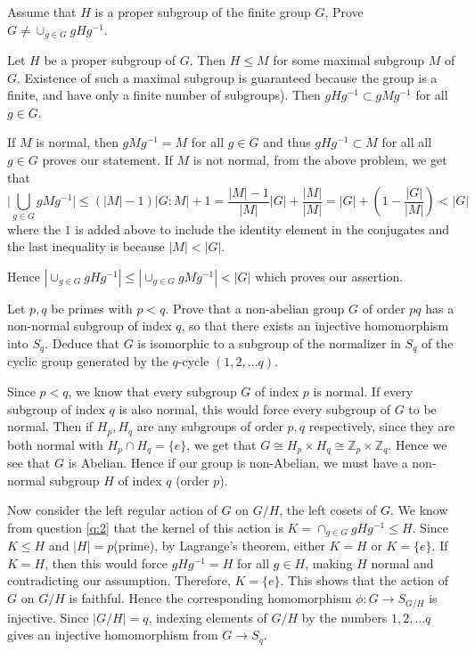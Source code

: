 \documentclass[12pt]{exam}
\theoremstyle{plain} %
\theoremstyle{definition} %
\theoremstyle{remark} %
\begin{document}
\begin{questions}
  \question
  Assume that $H$ is a proper subgroup of the finite group $G$, Prove
  $G \neq \cup_{g \in G}gHg^{-1}$.
  \begin{solution}
    Let $H$ be a proper subgroup of $G$. Then $H \leqslant M$ for
    some maximal subgroup $M$ of $G$. Existence of such a maximal
    subgroup is guaranteed because the group
  is a finite, and have only a finite number of subgroups).
  Then $gHg^{-1} \subset gMg^{-1}$ for all $g \in G$.

  If $M$ is normal, then $gMg^{-1} = M$ for all $g \in G$ and thus $gHg^{-1}
  \subset M$ for all all $g \in G$ proves our statement.
  If $M$ is not normal, from the above problem, we get that \[
    \big|\bigcup_{g \in G}gMg^{-1}\big| \le (|M| - 1)|G:M| + 1 =
    \frac{|M|-1}{|M|}|G| + \frac{|M|}{|M|} = |G| + (1 - \frac{|G|}{|M|}) < |G|
  \]
  where the $1$ is added above to include the identity element in
  the conjugates and the last inequality is because $|M| < |G|$.

  Hence $|\cup_{g \in G}gHg^{-1}| \le |\cup_{g \in G}gMg^{-1}| <
  |G|$ which proves our assertion.
\end{solution}

\question
Let $p, q$ be primes with $p < q$. Prove that a non-abelian group $G$
of order $pq$ has a non-normal subgroup of index $q$, so that there
exists an injective homomorphism into $S_q$. Deduce that $G$ is
isomorphic to a subgroup of the normalizer in $S_q$ of the cyclic
group generated by the $q$-cycle $(1, 2, \ldots q)$.
\begin{solution}
  Since $p < q$, we know that every subgroup $G$ of index $p$ is
  normal. If every subgroup of index $q$ is also normal, this would
  force every subgroup of $G$ to be normal. Then if $H_p, H_q$ are
  any subgroups of order $p, q$ respectively, since they are both
  normal with $H_p \cap H_q = \{ e \}$, we get that $G \cong H_p
  \times H_q \cong \mathbb{Z}_p \times \mathbb{Z}_q$. Hence we see
  that $G$ is Abelian. Hence if our group is non-Abelian, we must have a
  non-normal subgroup $H$ of index $q$ (order $p$).

  Now consider the left regular action of $G$ on $G/H$, the left
  cosets of $G$. We know from question \ref{q:2} that the kernel of
  this action is $K = \cap_{g \in G}gHg^{-1} \leqslant H$. Since $K
  \leqslant H$ and $|H| = p$(prime), by Lagrange's theorem, either $K
  = H$ or $K = \{ e \}$.
  If $K = H$, then this would force $gHg^{-1} = H$ for all $g \in H$,
  making $H$ normal and contradicting our assumption. Therefore, $K =
  \{ e \}$. This shows that the action of $G$ on $G/H$ is faithful.
  Hence the corresponding homomorphism $\phi:G \to S_{G/H}$ is injective.
  Since $|G/H| = q$, indexing elements of $G/H$ by the numbers $1, 2,
  \ldots q$ gives an injective homomorphism from $G \to S_q$.


\end{solution}
\end{questions}
\end{document}

